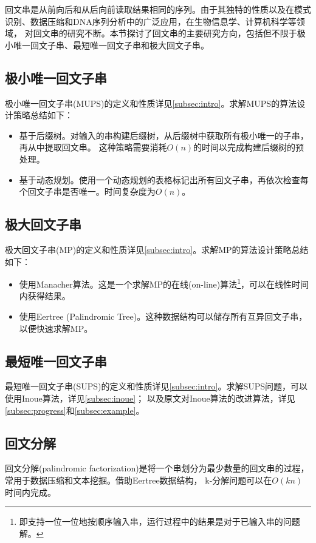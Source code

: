 
回文串是从前向后和从后向前读取结果相同的序列。由于其独特的性质以及在模式识别、数据压缩和DNA序列分析中的广泛应用，在生物信息学、计算机科学等领域，
对回文串的研究不断。本节探讨了回文串的主要研究方向，包括但不限于极小唯一回文子串、最短唯一回文子串和极大回文子串。

\subsection{极小唯一回文子串}\label{subsec:mups}

极小唯一回文子串(MUPS)的定义和性质详见\ref{subsec:intro}。求解MUPS的算法设计策略总结如下：
\begin{itemize}
    \item 基于后缀树。对输入的串构建后缀树，从后缀树中获取所有极小唯一的子串，再从中提取回文串\cite{Gusfield_1997}。
    这种策略需要消耗$O(n)$的时间以完成构建后缀树的预处理\cite{Ukkonen95}。
    \item 基于动态规划。使用一个动态规划的表格标记出所有回文子串，再依次检查每个回文子串是否唯一。时间复杂度为$O(n)$\cite{Manacher75}。
\end{itemize}

\subsection{极大回文子串}\label{subsec:mp}

极大回文子串(MP)的定义和性质详见\ref{subsec:intro}。求解MP的算法设计策略总结如下：
\begin{itemize}
    \item 使用Manacher算法\cite{Manacher75}。这是一个求解MP的在线(on-line)算法\footnote{即支持一位一位地按顺序输入串，运行过程中的结果是对于已输入串的问题解。}，可以在线性时间内获得结果。
    \item 使用Eertree (Palindromic Tree)\cite{RubinchikS18}。这种数据结构可以储存所有互异回文子串，以便快速求解MP。
\end{itemize}

\subsection{最短唯一回文子串}\label{subsec:sups}

最短唯一回文子串(SUPS)的定义和性质详见\ref{subsec:intro}。求解SUPS问题，可以使用Inoue算法\cite{Inoue2018}，详见\ref{subsec:inoue}；
以及原文\cite{Mieno2024}对Inoue算法的改进算法，详见\ref{subsec:progress}和\ref{subsec:example}。

\subsection{回文分解}\label{subsec:factorize}
回文分解(palindromic factorization)是将一个串划分为最少数量的回文串的过程，常用于数据压缩和文本挖掘。借助Eertree数据结构，
k-分解问题可以在$O(kn)$时间内完成\cite{RubinchikS18}。
